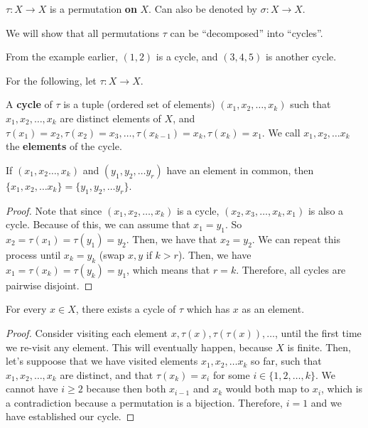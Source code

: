 
\begin{notation}
	\( \tau : X \to X \) is a permutation \textbf{on} \( X \). Can also be denoted by \( \sigma : X \to X \).
\end{notation}

We will show that all permutations \( \tau  \) can be ``decomposed'' into ``cycles''.

\begin{eg}
	From the example earlier, \( (1,2) \) is a cycle, and \( (3,4,5) \) is another cycle.
\end{eg}

For the following, let \( \tau : X \to X \).

\begin{definition}
	A \textbf{cycle} of \( \tau  \) is a tuple (ordered set of elements) \( (x_{1},x_{2},\ldots ,x_k) \) such that \( x_{1},x_{2},\ldots ,x_k \) are distinct elements of \( X \), and \( \tau (x_{1})=x_{2}, \tau (x_{2})=x_{3},\ldots,\tau (x_{k-1})=x_k, \tau (x_k)=x_{1}  \). We call \( x_{1},x_{2},\ldots x_k \) the \textbf{elements} of the cycle.
\end{definition}

\begin{lemma}
	If \( (x_{1},x_{2}\ldots ,x_k) \) and \( (y_{1},y_{2},\ldots y_r) \) have an element in common, then \( \{x_{1},x_{2},\ldots x_k\} =\{y_{1},y_{2},\ldots y_r\}    \).
\end{lemma}
\begin{proof}
	Note that since \( (x_{1},x_{2},\ldots ,x_k) \) is a cycle, \( (x_{2},x_{3},\ldots ,x_k,x_1) \) is also a cycle. Because of this, we can assume that \( x_{1}=y_{1} \). So \( x_{2}=\tau (x_{1})=\tau (y_{1})=y_{2} \).  Then, we have that \( x_{2}=y_{2} \). We can repeat this process until \( x_k=y_k \) (swap \( x,y \) if \( k > r \)). Then, we have \( x_{1}=\tau (x_k)=\tau (y_k)=y_{1} \), which means that \( r=k \). Therefore, all cycles are pairwise disjoint.
\end{proof}

\begin{lemma}
	For every \( x \in X \), there exists a cycle of \( \tau  \) which has \( x \) as an element.
\end{lemma}
\begin{proof}
	Consider visiting each element \( x,\tau (x), \tau (\tau (x)), \ldots  \), until the first time we re-visit any element. This will eventually happen, because \( X \) is finite. Then, let's suppoose that we have visited elements \( x_{1},x_{2},\ldots x_k \) so far, such that \( x_{1},x_{2},\ldots ,x_k \) are distinct, and that \( \tau (x_k)=x_i \) for some \( i \in \{1,2,\ldots ,k\}   \). We cannot have \( i\ge 2 \) because then both \( x_{i-1} \) and \( x_k \) would both map to \( x_i \), which is a contradiction because a permutation is a bijection. Therefore, \( i=1 \) and we have established our cycle.
\end{proof}

